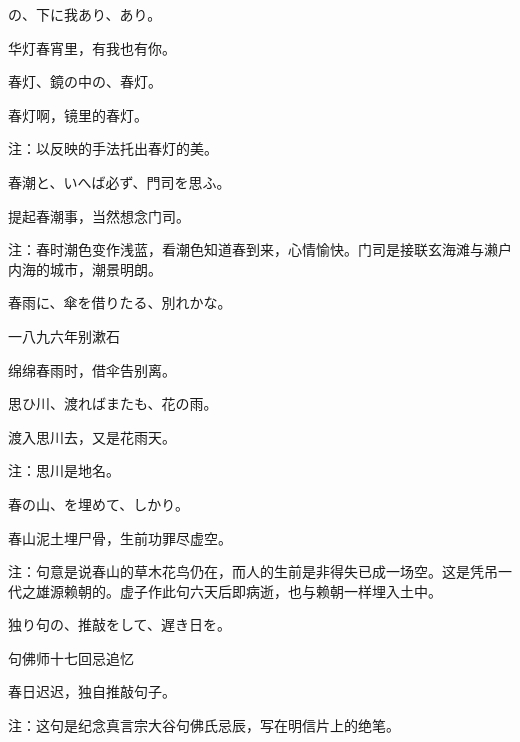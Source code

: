 \begin{haiku}
    {\FH {}の、下に我あり、あり。}

    {\FK 华灯春宵里，有我也有你。}
\end{haiku}

\begin{haiku}
    {\FH 春灯、鏡の中の、春灯。}

    {\FK 春灯啊，镜里的春灯。}

    {\FT 注：以反映的手法托出春灯的美。}
\end{haiku}

\begin{haiku}
    {\FH 春潮と、いへば必ず、門司を思ふ。}

    {\FK 提起春潮事，当然想念门司。}

    {\FT 注：春时潮色变作浅蓝，看潮色知道春到来，心情愉快。门司是接联玄海滩与濑户内海的城市，潮景明朗。}
\end{haiku}

\begin{haiku}
    {\FH 春雨に、傘を借りたる、別れかな。}

    {\FK 一八九六年别漱石}

    {\FK 绵绵春雨时，借伞告别离。}
\end{haiku}

\begin{haiku}
    {\FH 思ひ川、渡ればまたも、花の雨。}

    {\FK 渡入思川去，又是花雨天。}

    {\FT 注：思川是地名。}
\end{haiku}

\begin{haiku}
    {\FH 春の山、を埋めて、しかり。}

    {\FK 春山泥土埋尸骨，生前功罪尽虚空。}

    {\FT 注：句意是说春山的草木花鸟仍在，而人的生前是非得失已成一场空。这是凭吊一代之雄源赖朝的。虚子作此句六天后即病逝，也与赖朝一样埋入土中。}
\end{haiku}

\begin{haiku}
    {\FH 独り句の、推敲をして、遅き日を。}

    {\FK 句佛师十七回忌追忆}

    {\FK 春日迟迟，独自推敲句子。}

    {\FT 注：这句是纪念真言宗大谷句佛氏忌辰，写在明信片上的绝笔。}
\end{haiku}


